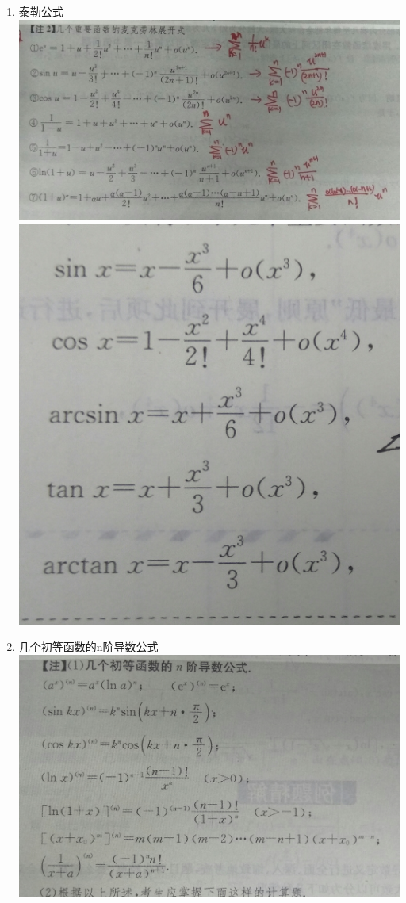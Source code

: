 \documentclass[11pt]{article}
\makeatletter
\def\maxwidth{\ifdim\Gin@nat@width>\linewidth\linewidth
    \else\Gin@nat@width\fi}
\let\Oldincludegraphics\includegraphics
\renewcommand{\includegraphics}[1]{\Oldincludegraphics[width=.8\maxwidth]{#1}}
\makeatother
\begin{document}
\begin{enumerate}
\item
  泰勒公式\\
  \includegraphics{9345E7/F04F85A8EB6EABFF18D6BE71383F2472.jpg}
  \includegraphics{9345E7/DBC6F35DE00EFED64F77BDBF8DE279EE.jpg}
\item
  几个初等函数的n阶导数公式\\
  \includegraphics{9345E7/2A793F093B002F668B144F9ED087EB77.jpg}

\end{enumerate}
\end{document}
